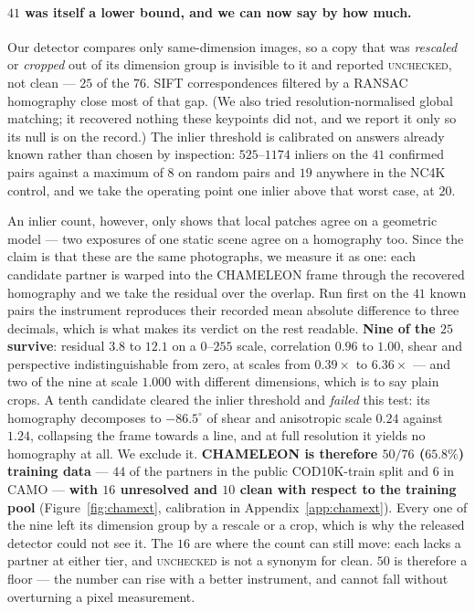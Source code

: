 \documentclass{article} %
\begin{document}
\paragraph{$41$ was itself a lower bound, and we can now say by how much.} Our detector compares
only same-dimension images, so a copy that was \emph{rescaled} or \emph{cropped} out of its dimension
group is invisible to it and reported \textsc{unchecked}, not clean --- $25$ of the $76$. SIFT
correspondences filtered by a RANSAC homography close most of that gap. (We also tried
resolution-normalised global matching; it recovered nothing these keypoints did not, and we report
it only so its null is on the record.) The inlier threshold is calibrated on answers already known
rather than chosen by inspection: $525$--$1174$ inliers on the $41$ confirmed pairs against a
maximum of $8$ on random pairs and $19$ anywhere in the NC4K control, and we take the operating
point one inlier above that worst case, at $20$.

An inlier count, however, only shows that local patches agree on a geometric model --- two exposures
of one static scene agree on a homography too. Since the claim is that these are the same
photographs, we measure it as one: each candidate partner is warped into the CHAMELEON frame through
the recovered homography and we take the residual over the overlap. Run first on the $41$ known
pairs the instrument reproduces their recorded mean absolute difference to three decimals, which is
what makes its verdict on the rest readable. \textbf{Nine of the $25$ survive}: residual $3.8$ to
$12.1$ on a $0$--$255$ scale, correlation $0.96$ to $1.00$, shear and perspective indistinguishable
from zero, at scales from $0.39\times$ to $6.36\times$ --- and two of the nine at scale $1.000$ with
different dimensions, which is to say plain crops. A tenth candidate cleared the inlier threshold
and \emph{failed} this test: its homography decomposes to $-86.5^\circ$ of shear and anisotropic
scale $0.24$ against $1.24$, collapsing the frame towards a line, and at full resolution it yields
no homography at all. We exclude it. \textbf{CHAMELEON is therefore $50/76$ ($65.8\%$)
training data} --- $44$ of the partners in the public COD10K-train split and $6$ in CAMO ---
\textbf{with $16$ unresolved and $10$ clean with respect to the training pool}
(Figure~\ref{fig:chamext}, calibration in Appendix~\ref{app:chamext}). Every one of the nine left its
dimension group by a rescale or a crop, which is why the released detector could not see it. The
$16$ are where the count can still move: each lacks a partner at either tier, and \textsc{unchecked}
is not a synonym for clean. $50$ is therefore a floor --- the number can rise with a better
instrument, and cannot fall without overturning a pixel measurement.
\end{document}
